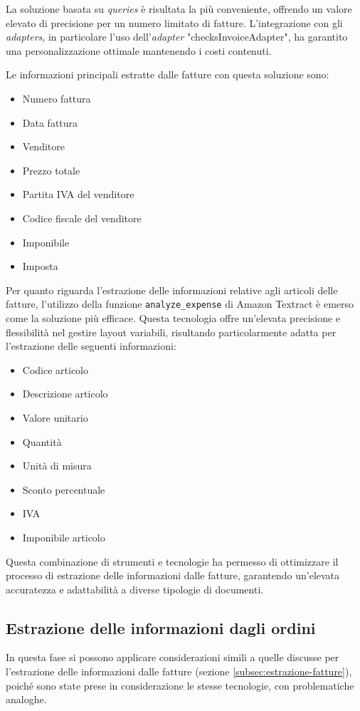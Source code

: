 La soluzione basata su \textit{queries} è risultata la più conveniente, offrendo un valore elevato di precisione per un numero limitato di fatture. L'integrazione con gli \textit{adapters}, in particolare l'uso dell'\textit{adapter} "checksInvoiceAdapter", ha garantito una personalizzazione ottimale mantenendo i costi contenuti.

Le informazioni principali estratte dalle fatture con questa soluzione sono:

\begin{itemize}
    \item Numero fattura
    \item Data fattura
    \item Venditore
    \item Prezzo totale
    \item Partita IVA del venditore
    \item Codice fiscale del venditore
    \item Imponibile
    \item Imposta
\end{itemize}

Per quanto riguarda l'estrazione delle informazioni relative agli articoli delle fatture, l'utilizzo della funzione \texttt{analyze\_expense} di Amazon Textract è emerso come la soluzione più efficace. Questa tecnologia offre un'elevata precisione e flessibilità nel gestire layout variabili, risultando particolarmente adatta per l'estrazione delle seguenti informazioni:

\begin{itemize}
    \item Codice articolo
    \item Descrizione articolo
    \item Valore unitario
    \item Quantità
    \item Unità di misura
    \item Sconto percentuale
    \item IVA
    \item Imponibile articolo
\end{itemize}

Questa combinazione di strumenti e tecnologie ha permesso di ottimizzare il processo di estrazione delle informazioni dalle fatture, garantendo un'elevata accuratezza e adattabilità a diverse tipologie di documenti.


\subsection{Estrazione delle informazioni dagli ordini}
In questa fase si possono applicare considerazioni simili a quelle discusse per l'estrazione delle informazioni dalle fatture (sezione \ref{subsec:estrazione-fatture}), poiché sono state prese in considerazione le stesse tecnologie, con problematiche analoghe.

